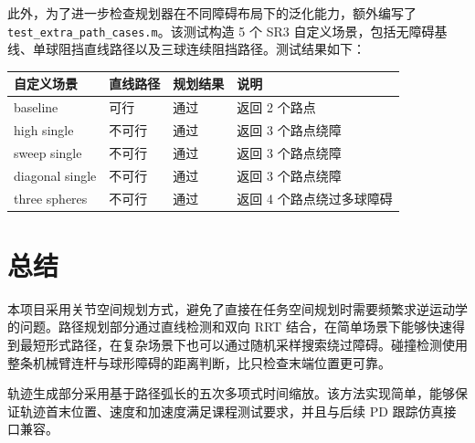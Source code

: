 \documentclass[UTF8,a4paper,12pt]{ctexart}
\begin{document}
此外，为了进一步检查规划器在不同障碍布局下的泛化能力，额外编写了
\nolinkurl{test_extra_path_cases.m}。该测试构造 5 个 SR3 自定义场景，包括无障碍基线、单球阻挡直线路径以及三球连续阻挡路径。测试结果如下：

\begin{table}[h]
\centering
\small
\begin{tabular}{llll}
\toprule
自定义场景 & 直线路径 & 规划结果 & 说明 \\
\midrule
baseline & 可行 & 通过 & 返回 2 个路点 \\
high single & 不可行 & 通过 & 返回 3 个路点绕障 \\
sweep single & 不可行 & 通过 & 返回 3 个路点绕障 \\
diagonal single & 不可行 & 通过 & 返回 3 个路点绕障 \\
three spheres & 不可行 & 通过 & 返回 4 个路点绕过多球障碍 \\
\bottomrule
\end{tabular}
\end{table}

\section{总结}

本项目采用关节空间规划方式，避免了直接在任务空间规划时需要频繁求逆运动学的问题。路径规划部分通过直线检测和双向 RRT 结合，在简单场景下能够快速得到最短形式路径，在复杂场景下也可以通过随机采样搜索绕过障碍。碰撞检测使用整条机械臂连杆与球形障碍的距离判断，比只检查末端位置更可靠。

轨迹生成部分采用基于路径弧长的五次多项式时间缩放。该方法实现简单，能够保证轨迹首末位置、速度和加速度满足课程测试要求，并且与后续 PD 跟踪仿真接口兼容。
\end{document}
